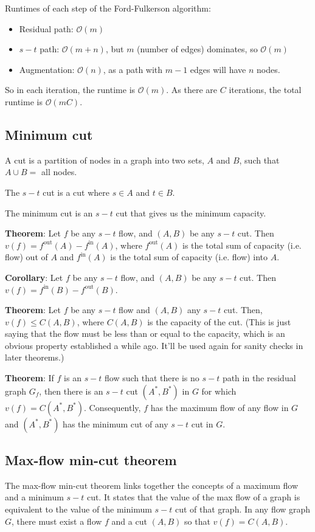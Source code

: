 \documentclass{article}
\newcommand{\Oh}{\mathcal{O}}
\begin{document}
Runtimes of each step of the Ford-Fulkerson algorithm:
\begin{itemize}
    \item Residual path: $\Oh(m)$
    \item $s-t$ path: $\Oh(m + n)$, but $m$ (number of edges) dominates, so $\Oh(m)$
    \item Augmentation: $\Oh(n)$, as a path with $m-1$ edges will have $n$ nodes.
\end{itemize}

So in each iteration, the runtime is $\Oh(m)$. As there are $C$ iterations, the total runtime is $\Oh(mC)$.

\subsection{Minimum cut}
A cut is a partition of nodes in a graph into two sets, $A$ and $B$, such that $A \cup B =$ all nodes.

The $s-t$ cut is a cut where $s \in A$ and $t \in B$.

The minimum cut is an $s-t$ cut that gives us the minimum capacity.

\textbf{Theorem}: Let $f$ be any $s-t$ flow, and $(A, B)$ be any $s-t$ cut. Then $v(f) = f^{\text{out}}(A) - f^{\text{in}}(A)$, where $f^{\text{out}}(A)$ is the total sum of capacity (i.e. flow) out of $A$ and $f^{\text{in}}(A)$ is the total sum of capacity (i.e. flow) into $A$.

\textbf{Corollary}: Let $f$ be any $s-t$ flow, and $(A, B)$ be any $s-t$ cut. Then $v(f) = f^{\text{in}}(B) - f^{\text{out}}(B)$.

\textbf{Theorem}: Let $f$ be any $s-t$ flow and $(A, B)$ any $s-t$ cut. Then, $v(f) \leq C(A, B)$, where $C(A, B)$ is the capacity of the cut. (This is just saying that the flow must be less than or equal to the capacity, which is an obvious property established a while ago. It'll be used again for sanity checks in later theorems.)

\textbf{Theorem}: If $f$ is an $s-t$ flow such that there is no $s-t$ path in the residual graph $G_f$, then there is an $s-t$ cut $(A^*, B^*)$ in $G$ for which $v(f) = C(A^*, B^*)$. Consequently, $f$ has the maximum flow of any flow in $G$ and $(A^*, B^*)$ has the minimum cut of any $s-t$ cut in $G$.

\subsection{Max-flow min-cut theorem}
The max-flow min-cut theorem links together the concepts of a maximum flow and a minimum $s-t$ cut. It states that the value of the max flow of a graph is equivalent to the value of the minimum $s-t$ cut of that graph. In any flow graph $G$, there must exist a flow $f$ and a cut $(A, B)$ so that $v(f) = C(A, B)$.
\end{document}
